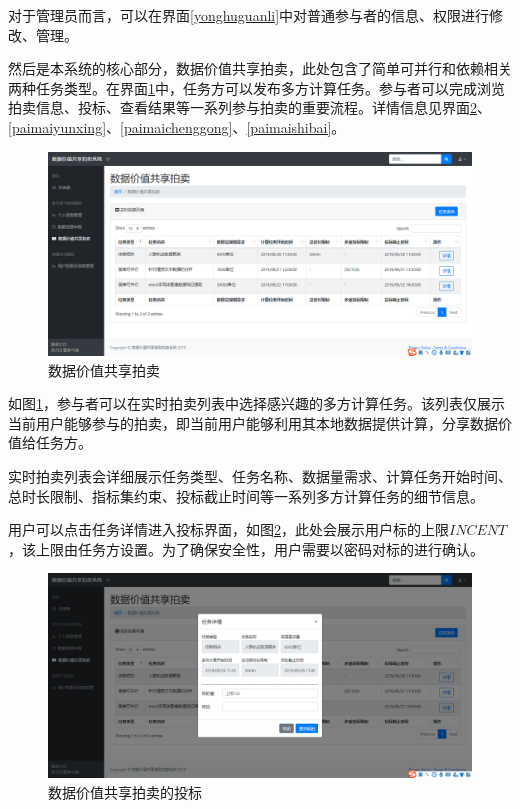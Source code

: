 \documentclass[promaster]{thesis-uestc}
\begin{document}
对于管理员而言，可以在界面\ref{yonghuguanli}中对普通参与者的信息、权限进行修改、管理。

然后是本系统的核心部分，数据价值共享拍卖，此处包含了简单可并行和依赖相关两种任务类型。在界面\ref{paimai}中，任务方可以发布多方计算任务。参与者可以完成浏览拍卖信息、投标、查看结果等一系列参与拍卖的重要流程。详情信息见界面\ref{paimaitoubiao}、\ref{paimaiyunxing}、\ref{paimaichenggong}、\ref{paimaishibai}。

\begin{figure}[H]
    \includegraphics[width=400pt]{ui/paimai.png}
    \caption{数据价值共享拍卖}
    \label{paimai}
\end{figure}

如图\ref{paimai}，参与者可以在实时拍卖列表中选择感兴趣的多方计算任务。该列表仅展示当前用户能够参与的拍卖，即当前用户能够利用其本地数据提供计算，分享数据价值给任务方。

实时拍卖列表会详细展示任务类型、任务名称、数据量需求、计算任务开始时间、总时长限制、指标集约束、投标截止时间等一系列多方计算任务的细节信息。

用户可以点击任务详情进入投标界面，如图\ref{paimaitoubiao}，此处会展示用户标的上限$INCENT$，该上限由任务方设置。为了确保安全性，用户需要以密码对标的进行确认。

\begin{figure}[H]
    \includegraphics[width=400pt]{ui/paimaitoubiao.png}
    \caption{数据价值共享拍卖的投标}
    \label{paimaitoubiao}
\end{figure}
\end{document}

